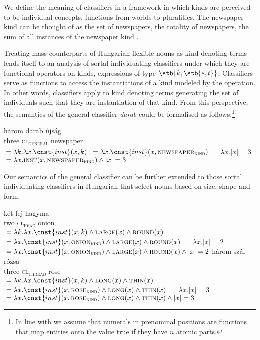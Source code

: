 \documentclass[output=paper]{langscibook}
\begin{document}
We define the meaning of classifiers in a framework in which kinds are perceived to be individual concepts, functions from worlds to pluralities. The newspaper-kind can be thought of as the set of newspapers, the totality of newspapers, the sum of all instances of the newspaper kind \citep{chierchia-98b}. 

Treating mass-counterparts of Hungarian flexible nouns as kind-denoting terms lends itself to an analysis of sortal individuating classifiers under which they are functional operators on kinds, expressions of type  $\stb{k,\stb{e,t}}$. Classifiers serve as functions to access the instantiations of a kind modeled by the  operation. In other words, classifiers apply to kind denoting terms generating the set of individuals such that they are instantiation of that kind.  From this perspective, the semantics of the general classifier \textit{darab} could be formalised as follows:\footnote{In line with \citet{rothstein17} we assume that numerals in prenominal positions are functions that map entities onto the value true if they have $n$ atomic parts.}
 

\ea \label{schv-nem:ex:50}
\ea
\gll három darab újság \\
three \textsc{cl\textsubscript{general}} newspaper\\
\ex {}${} = \lambda k. \lambda x.\cnst{inst}(x,k)$
\ex {}${} = \lambda x.\cnst{inst}(x,\textsc{newspaper}_{\textsc{kind}})$
\ex {}${} = \lambda x.  |x| =3$ %
\ex {}${} =  \lambda x.\textsc{inst}(x,\textsc{newspaper}_{\textsc{kind}}) \wedge |x| =3$
\z
\z


\noindent  Our semantics of the general classifier can be further extended to those sortal individuating classifiers in Hungarian that select nouns based on size, shape and form:

\ea \label{schv-nem:ex:51}
\ea
\gll két fej hagyma \\
two \textsc{cl\textsubscript{head}} onion\\
\ex {}${} = \lambda k. \lambda x.\cnst{inst}(x,k) \wedge \textsc{large}(x) \wedge \textsc{round}(x)$
\ex {}${} = \lambda x.\cnst{inst}(x,\textsc{onion}_{\textsc{kind}}) \wedge \textsc{large}(x) \wedge \textsc{round}(x)$
\ex {}${} = \lambda x.  |x| =2$
\ex {}\\${} =  \lambda x.\cnst{inst}(x,\textsc{onion}_{\textsc{kind}})\wedge \textsc{large}(x) \wedge \textsc{round}(x) \wedge |x| =2$
\z
\ex \label{schv-nem:ex:52}
\ea
\gll három szál rózsa \\
three \textsc{cl\textsubscript{thread}} rose\\
\ex {}${} = \lambda k. \lambda x.\cnst{inst}(x,k) \wedge \textsc{long}(x) \wedge \textsc{thin}(x)$
\ex {}${} = \lambda x.\cnst{inst}(x,\textsc{rose}_{\textsc{kind}}) \wedge \textsc{long}(x) \wedge \textsc{thin}(x)$
\ex {}${} = \lambda x.  |x| =3$
\ex {}\\${} =  \lambda x.\cnst{inst}(x,\textsc{rose}_{\textsc{kind}}) \wedge \textsc{long}(x) \wedge \textsc{thin}(x) \wedge |x| =3$
\z
\z
\end{document}
